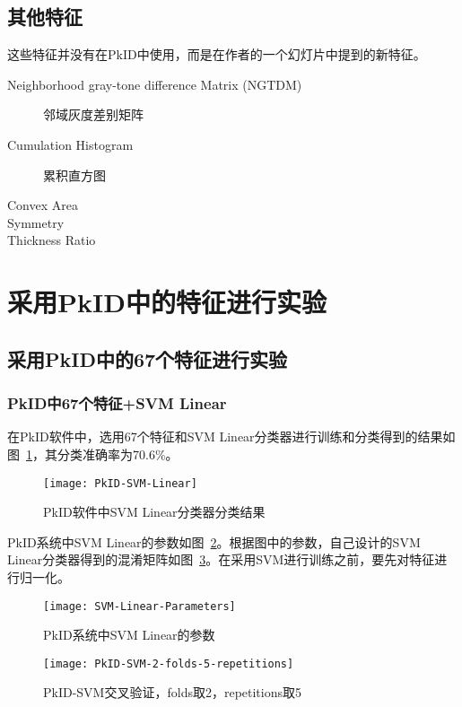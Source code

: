 \subsection{其他特征}
这些特征并没有在PkID中使用，而是在作者的一个幻灯片中提到的新特征。
\begin{description}
\item[Neighborhood gray-tone difference Matrix (NGTDM)] 邻域灰度差别矩阵
\item[Cumulation Histogram] 累积直方图
\item[Convex Area] 
\item[Symmetry] 
\item[Thickness Ratio]
\end{description}


\section{采用PkID中的特征进行实验}

\subsection{采用PkID中的67个特征进行实验}
\subsubsection{PkID中67个特征+SVM Linear}
在PkID软件中，选用67个特征和SVM Linear分类器进行训练和分类得到的结果如图~\ref{fig:PkID-SVM-Linear}，其分类准确率为70.6\%。
\begin{figure}[!ht]
\centering
\texttt{[image: PkID-SVM-Linear]}
\caption{PkID软件中SVM Linear分类器分类结果}
\label{fig:PkID-SVM-Linear}
\end{figure}

PkID系统中SVM Linear的参数如图~\ref{fig:SVM-Linear-Parameters}。根据图中的参数，自己设计的SVM Linear分类器得到的混淆矩阵如图~\ref{fig: PkID-SVM-2-folds-5-repetitions}。在采用SVM进行训练之前，要先对特征进行归一化。
\begin{figure}[!ht]
\centering
\texttt{[image: SVM-Linear-Parameters]}
\caption{PkID系统中SVM Linear的参数}
\label{fig:SVM-Linear-Parameters}
\end{figure}
\begin{figure}[!ht]
\centering
\texttt{[image: PkID-SVM-2-folds-5-repetitions]}
\caption{PkID-SVM交叉验证，folds取2，repetitions取5}
\label{fig: PkID-SVM-2-folds-5-repetitions}
\end{figure}

